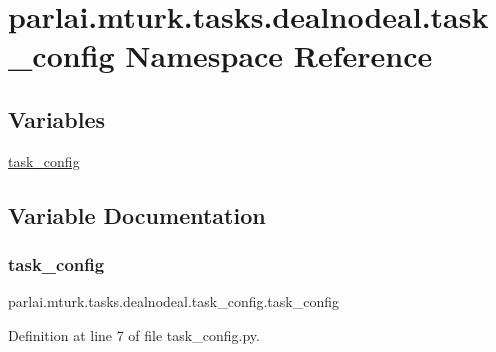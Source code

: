 \hypertarget{namespaceparlai_1_1mturk_1_1tasks_1_1dealnodeal_1_1task__config}{}\section{parlai.\+mturk.\+tasks.\+dealnodeal.\+task\+\_\+config Namespace Reference}
\label{namespaceparlai_1_1mturk_1_1tasks_1_1dealnodeal_1_1task__config}
\subsection*{Variables}
\begin{DoxyCompactItemize}
\item 
\hyperlink{namespaceparlai_1_1mturk_1_1tasks_1_1dealnodeal_1_1task__config_a7b05e490f21ab15ba70d10bbf96bd04d}{task\+\_\+config}
\end{DoxyCompactItemize}


\subsection{Variable Documentation}
\mbox{\label{namespaceparlai_1_1mturk_1_1tasks_1_1dealnodeal_1_1task__config_a7b05e490f21ab15ba70d10bbf96bd04d}} 
\subsubsection{\texorpdfstring{task\+\_\+config}{task\_config}}
{\footnotesize\ttfamily parlai.\+mturk.\+tasks.\+dealnodeal.\+task\+\_\+config.\+task\+\_\+config}



Definition at line 7 of file task\+\_\+config.\+py.

